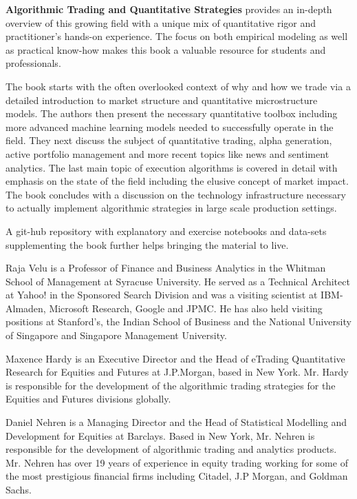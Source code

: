 \pagestyle{empty}

\noindent\textbf{Algorithmic Trading and Quantitative Strategies} provides an in-depth overview of this growing field with a unique mix of quantitative rigor and practitioner’s hands-on experience. The focus on both empirical modeling as well as practical know-how makes this book a valuable resource for students and professionals.


The book starts with the often overlooked context of why and how we trade via a detailed introduction to market structure and quantitative microstructure models. The authors then
present the necessary quantitative toolbox including more advanced machine learning models needed to successfully operate in the field. They next discuss the subject of quantitative trading, alpha generation, active portfolio management and more recent topics like news and sentiment analytics. The last main topic of execution algorithms is covered in detail  with emphasis on the state of the field including the elusive concept of market impact. The book concludes with a discussion on the technology infrastructure necessary to actually implement algorithmic strategies in large scale production settings. 


A git-hub repository with explanatory and exercise notebooks and data-sets supplementing the book further helps bringing the material to live. \twomedskip


\noindent Raja Velu is a Professor of Finance and Business Analytics in the Whitman School of Management at Syracuse University. He served as a Technical Architect at Yahoo! in the Sponsored Search Division and was a visiting scientist at IBM-Almaden, Microsoft Research, Google and JPMC. He has also held visiting positions at Stanford's, the Indian School of Business and the National University of Singapore and Singapore Management University. \medskip

\noindent Maxence Hardy is an Executive Director and the Head of eTrading Quantitative Research for Equities and Futures at J.P.Morgan, based in New York. Mr. Hardy is responsible for the development of the algorithmic trading strategies for the Equities and Futures divisions globally. \medskip

\noindent Daniel Nehren is a Managing Director and the Head of Statistical Modelling and Development for Equities at Barclays. Based in New York, Mr. Nehren is responsible for the development of algorithmic trading and analytics products. Mr. Nehren has over 19 years of experience in equity trading working for some of the most prestigious financial firms including Citadel, J.P Morgan, and Goldman Sachs. 